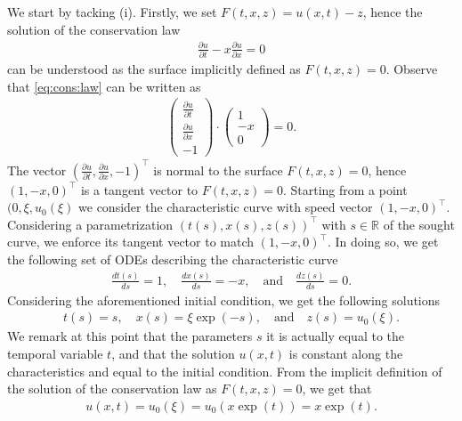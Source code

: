 \documentclass[10pt,letterpaper]{article}
\theoremstyle{break}
\begin{document}
\begin{solution}
	We start by tacking (i).
	Firstly, we set $F(t,x,z) = u(x,t) -z$, hence the solution
	of the conservation law
	\begin{align}\label{eq:cons:law}
		\frac{\partial u}{\partial t}
		-
		x
		\frac{\partial u}{\partial x}
		= 0
	\end{align}
	can be understood as the surface implicitly defined as $F(t,x,z) = 0$.
	Observe that \ref{eq:cons:law} can be written as
	\begin{align}
		\begin{pmatrix}
			\frac{\partial u}{\partial t} \\
			\frac{\partial u}{\partial x} \\
			-1
		\end{pmatrix}
		\cdot
		\begin{pmatrix}
		1 \\
		-x \\
		0
		\end{pmatrix}
		= 0.
	\end{align}
	The vector $(\frac{\partial u}{\partial t},\frac{\partial u}{\partial x} ,-1)^\top $
	is normal to the surface $F(t,x,z) =0$, hence
	$(1,-x,0)^\top$ is a tangent vector to $F(t,x,z) =0$.
	Starting from a point $(0,\xi,u_0(\xi)$ we consider the characteristic curve
	with speed vector $(1,-x,0)^\top$. Considering a parametrization
	$(t(s),x(s),z(s))^\top$ with $s \in \mathbb{R}$ of the sought curve, we enforce its tangent 
	vector to match $ (1,-x,0)^\top$. In doing so, we get the following set of ODEs
	describing the characteristic curve
	\begin{align}
		\frac{dt(s)}{ds} =1,
		\quad
		\frac{dx(s)}{ds} =-x,
		\quad
		\text{and}
		\quad
		\frac{dz(s)}{ds} =0.
	\end{align}
	Considering the aforementioned initial condition, we get the following solutions
	\begin{align}
		t(s) =s,
		\quad
		x(s) = \xi \exp(-s),
		\quad
		\text{and}
		\quad
		z(s) = u_0(\xi).
	\end{align}
	We remark at this point that the parameters $s$ it is 
	actually equal to the temporal variable $t$, and that
	the solution $u(x,t)$ is constant along the characteristics
	and equal to the initial condition. 
	From the implicit definition of the solution of the conservation law
	as $F(t,x,z) =0$, we get that 
	\begin{align}\label{eq:cons:law_sol}
		u(x,t) = u_0(\xi) = u_0(x \exp(t)) = x \exp(t).
	\end{align}

\end{solution}
\end{document}
